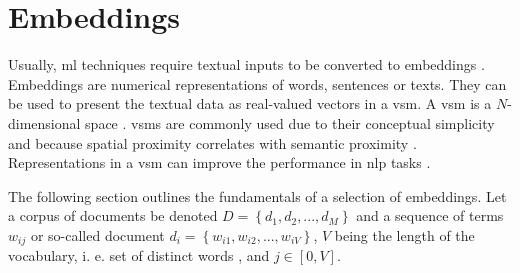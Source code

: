 \section{Embeddings}\label{sec:embeddings}

Usually, \ac{ml} techniques require textual inputs to be converted to embeddings \cite{SentRep2014}.
Embeddings are numerical representations of words, sentences or texts.
They can be used to present the textual data as real-valued vectors in a \ac{vsm}.
A \ac{vsm} is a $N$-dimensional space \cite{soft_cosine2014}.
\acp{vsm} are commonly used due to their conceptual simplicity and because spatial proximity correlates with semantic proximity 
\cite{tfidf2008, UniversalSentEnc2018, HfsentTrans2019, Top2Vec2020}.
Representations in a \ac{vsm} can improve the performance in \ac{nlp} tasks \cite{SkipGram2013}.

The following section outlines the fundamentals of a selection of embeddings.
Let a corpus of documents be denoted $D= \left\{d_1, d_2, ..., d_M  \right\}$ 
and a sequence of terms $w_{ij}$ or so-called document $d_i = \left\{w_{i1}, w_{i2}, ..., w_{iV}  \right\}$, 
$V$ being the length of the vocabulary, 
i. e. set of distinct words \cite{clusteringDocs2020}, and $j \in [0, V]$.










